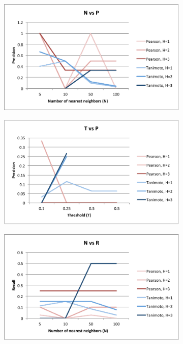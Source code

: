 \documentclass{article}
\begin{document}
\begin{figure}[H]
\centering
\begin{subfigure}{.4\textwidth}
  \centering
  \includegraphics[width=.9\linewidth]{img/nvp.pdf}
  \label{fig:nvp}
\end{subfigure}%
\begin{subfigure}{.4\textwidth}
  \centering
  \includegraphics[width=.9\linewidth]{img/tvp.pdf}
  \label{fig:tvp}
\end{subfigure}
\begin{subfigure}{.4\textwidth}
  \centering
  \includegraphics[width=.9\linewidth]{img/nvr.pdf}

\end{subfigure}
\end{figure}
\end{document}
